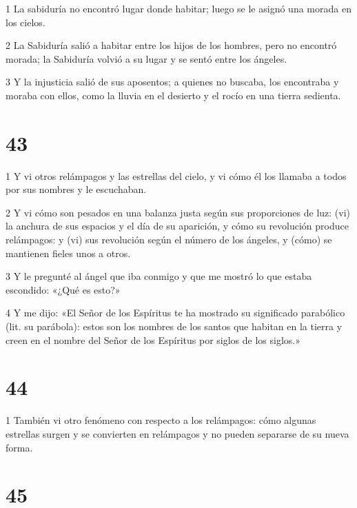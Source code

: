 \par 1 La sabiduría no encontró lugar donde habitar; luego se le asignó una morada en los cielos.
\par 2 La Sabiduría salió a habitar entre los hijos de los hombres, pero no encontró morada; la Sabiduría volvió a su lugar y se sentó entre los ángeles.
\par 3 Y la injusticia salió de sus aposentos; a quienes no buscaba, los encontraba y moraba con ellos, como la lluvia en el desierto y el rocío en una tierra sedienta.

\chapter{43}

\par 1 Y vi otros relámpagos y las estrellas del cielo, y vi cómo él los llamaba a todos por sus nombres y le escuchaban.
\par 2 Y vi cómo son pesados ​​en una balanza justa según sus proporciones de luz: (vi) la anchura de sus espacios y el día de su aparición, y cómo su revolución produce relámpagos: y (vi) sus revolución según el número de los ángeles, y (cómo) se mantienen fieles unos a otros.
\par 3 Y le pregunté al ángel que iba conmigo y que me mostró lo que estaba escondido: «¿Qué es esto?»
\par 4 Y me dijo: «El Señor de los Espíritus te ha mostrado su significado parabólico (lit. su parábola): estos son los nombres de los santos que habitan en la tierra y creen en el nombre del Señor de los Espíritus por siglos de los siglos.»

\chapter{44}

\par 1 También vi otro fenómeno con respecto a los relámpagos: cómo algunas estrellas surgen y se convierten en relámpagos y no pueden separarse de su nueva forma.

\chapter{45}

